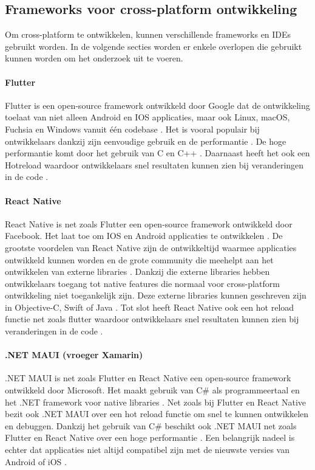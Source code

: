 \subsection{Frameworks voor cross-platform ontwikkeling}
Om cross-platform te ontwikkelen, kunnen verschillende frameworks en 
IDEs gebruikt worden. In de volgende secties worden er enkele overlopen die gebruikt kunnen worden  
om het onderzoek uit te voeren.

\paragraph{Flutter}
Flutter is een open-source framework ontwikkeld door Google dat de ontwikkeling toelaat 
van niet alleen Android en IOS applicaties, maar ook Linux, macOS, Fuchsia en Windows 
vanuit één codebase \autocite{Okeke2022a}. Het is vooral populair bij ontwikkelaars 
dankzij zijn eenvoudige gebruik en de performantie \autocite{Sakovich22023}. De 
hoge performantie komt door het gebruik van C en C++ \autocite{Terekhov2022}. Daarnaast 
heeft het ook een \gls{Hotreload} waardoor ontwikkelaars snel resultaten kunnen zien bij 
veranderingen in de code \autocite{Sakovich22023}.

\paragraph{React Native}
React Native is net zoals Flutter een open-source framework ontwikkeld door Facebook. 
Het laat toe om IOS en Android applicaties te ontwikkelen \autocite{Terekhov2022}. 
De grootste voordelen van React Native zijn de ontwikkeltijd waarmee applicaties ontwikkeld 
kunnen worden \autocite{Terekhov2022} en de grote community die meehelpt aan het ontwikkelen 
van externe libraries \autocite{Okeke2022a}. Dankzij die externe libraries hebben ontwikkelaars 
toegang tot native features die normaal voor cross-platform ontwikkeling niet toegankelijk zijn. 
Deze externe libraries kunnen geschreven zijn in Objective-C, Swift of Java \autocite{Okeke2022a}. 
Tot slot heeft React Native ook een hot reload functie net zoals flutter waardoor ontwikkelaars 
snel resultaten kunnen zien bij veranderingen in de code \autocite{Terekhov2022}.

\paragraph{.NET MAUI (vroeger Xamarin)}
.NET MAUI is net zoals Flutter en React Native een open-source framework ontwikkeld door 
Microsoft. Het maakt gebruik van C\# als programmeertaal en het .NET framework voor 
native libraries \autocite{Sakovich22023}. Net zoals bij Flutter en React Native bezit 
ook .NET MAUI over een hot reload functie om snel te kunnen ontwikkelen en debuggen. 
Dankzij het gebruik van C\# beschikt ook .NET MAUI net zoals Flutter en React Native over 
een hoge performantie \autocite{Okeke2022a}. Een belangrijk nadeel is echter dat 
applicaties niet altijd compatibel zijn met de nieuwste versies van 
Android of iOS \autocite{Terekhov2022}.

